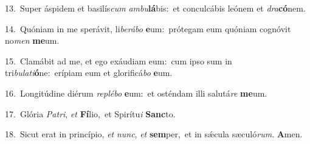 {\numbfont\textcolor{\numbcolor}{13.}}~Super áspidem et basilís\textit{cum} \textit{am}\-\textit{bu}\textbf{lá}bis:~\star et conculcábis leónem et \textit{dra}\-\textbf{có}nem.\par
{\numbfont\textcolor{\numbcolor}{14.}}~Quóniam in me sperávit, li\-\textit{be}\-\textit{rá}\textit{bo} \textbf{e}\-um:~\star prótegam eum quóniam cognóvit no\textit{men} \textbf{me}\-um.\par
{\numbfont\textcolor{\numbcolor}{15.}}~Clamábit ad me, et ego exáudiam eum:~\dagger cum ipso sum in tri\-\textit{bu}\-\textit{la}\textit{ti}\textbf{ó}ne:~\star erípiam eum et glorificá\textit{bo} \textbf{e}\-um.\par
{\numbfont\textcolor{\numbcolor}{16.}}~Longitúdine diérum \textit{re}\-\textit{plé}\textit{bo} \textbf{e}\-um:~\star et osténdam illi salutá\textit{re} \textbf{me}\-um.\par
{\numbfont\textcolor{\numbcolor}{17.}}~Glória \textit{Pa}\-\textit{tri}, \textit{et} \textbf{Fí}\-lio,~\star et Spirítu\textit{i} \textbf{Sanc}\-to.\par
{\numbfont\textcolor{\numbcolor}{18.}}~Sicut erat in princípio, \textit{et} \textit{nunc}\-, \textit{et} \textbf{sem}\-per,~\star et in sǽcula sæculó\-\textit{rum}\-. \textbf{A}\-men.\par
